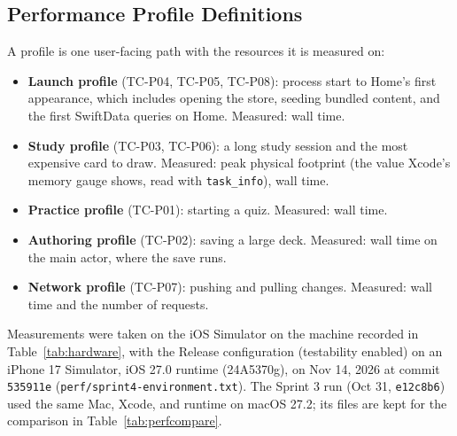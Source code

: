 \documentclass[12pt,letterpaper]{article}
\begin{document}
\subsection{Performance Profile Definitions}
A profile is one user-facing path with the resources it is measured on:
\begin{itemize}
  \item \textbf{Launch profile} (TC-P04, TC-P05, TC-P08): process start to Home's first
        appearance, which includes opening the store, seeding bundled content, and the
        first SwiftData queries on Home. Measured: wall time.
  \item \textbf{Study profile} (TC-P03, TC-P06): a long study session and the most
        expensive card to draw. Measured: peak physical footprint (the value Xcode's
        memory gauge shows, read with \texttt{task\_info}), wall time.
  \item \textbf{Practice profile} (TC-P01): starting a quiz. Measured: wall time.
  \item \textbf{Authoring profile} (TC-P02): saving a large deck. Measured: wall time
        on the main actor, where the save runs.
  \item \textbf{Network profile} (TC-P07): pushing
        and pulling changes. Measured: wall time and the number of requests.
\end{itemize}
Measurements were taken on the iOS Simulator on the machine recorded in
Table~\ref{tab:hardware}, with the Release configuration (testability enabled) on an
iPhone 17 Simulator, iOS 27.0 runtime (24A5370g), on Nov 14, 2026 at commit
\texttt{535911e} (\texttt{perf/sprint4-environment.txt}). The Sprint 3 run (Oct 31,
\texttt{e12c8b6}) used the same Mac, Xcode, and runtime on macOS 27.2; its files are
kept for the comparison in Table~\ref{tab:perfcompare}.
\end{document}
